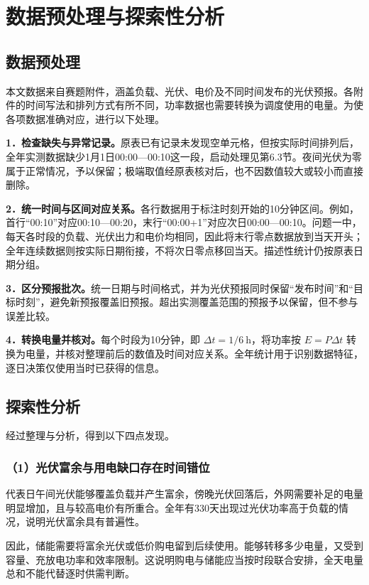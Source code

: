 \section{数据预处理与探索性分析}
\subsection{数据预处理}
本文数据来自赛题附件，涵盖负载、光伏、电价及不同时间发布的光伏预报。各附件的时间写法和排列方式有所不同，功率数据也需要转换为调度使用的电量。为使各项数据准确对应，进行以下处理。

\noindent\textbf{1．检查缺失与异常记录。}原表已有记录未发现空单元格，但按实际时间排列后，全年实测数据缺少1月1日00:00—00:10这一段，启动处理见第6.3节。夜间光伏为零属于正常情况，予以保留；极端取值经原表核对后，也不因数值较大或较小而直接删除。

\noindent\textbf{2．统一时间与区间对应关系。}各行数据用于标注时刻开始的10分钟区间。例如，首行“00:10”对应00:10—00:20，末行“00:00+1”对应次日00:00—00:10。问题一中，每天各时段的负载、光伏出力和电价均相同，因此将末行零点数据放到当天开头；全年连续数据则按实际日期衔接，不将次日零点移回当天。描述性统计仍按原表日期分组。

\noindent\textbf{3．区分预报批次。}统一日期与时间格式，并为光伏预报同时保留“发布时间”和“目标时刻”，避免新预报覆盖旧预报。超出实测覆盖范围的预报予以保留，但不参与误差比较。

\noindent\textbf{4．转换电量并核对。}每个时段为10分钟，即 $\Delta t=1/6\ \mathrm h$，将功率按 $E=P\Delta t$ 转换为电量，并核对整理前后的数值及时间对应关系。全年统计用于识别数据特征，逐日决策仅使用当时已获得的信息。

\subsection{探索性分析}
经过整理与分析，得到以下四点发现。

\subsubsection*{（1）光伏富余与用电缺口存在时间错位}

代表日午间光伏能够覆盖负载并产生富余，傍晚光伏回落后，外网需要补足的电量明显增加，且与较高电价有所重合。全年有330天出现过光伏功率高于负载的情况，说明光伏富余具有普遍性。

因此，储能需要将富余光伏或低价购电留到后续使用。能够转移多少电量，又受到容量、充放电功率和效率限制。这说明购电与储能应当按时段联合安排，全天电量总和不能代替逐时供需判断。

